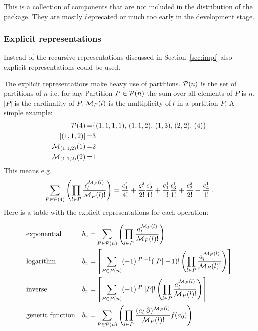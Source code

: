 \documentclass{article}
\begin{document}
This is a collection of components that are not included in the
distribution of the package. They are mostly deprecated or much too
early in the development stage.

\subsubsection{Explicit representations}

Instead of the recursive representations discussed in
Section~\ref{sec:impl} also explicit representations could be used.

The explicit representations make heavy use of partitions.
${\cal P}(n)$ is the set of partitions of $n$ i.e. for any
Partition $P \in {\cal P}(n)$ the sum over all elements of $P$ is
$n$. $|P|$ is the cardinality of $P$.
${\cal M}_P(l)$ is the multiplicity of $l$ in a partition $P$. A simple
example:
\begin{align*}
  {\cal P}(4)=&\{(1,1,1,1),\,(1,1,2),\,(1,3),\,(2,2),\,(4)\}\\
  |(1,1,2)|=&3\\
  {\cal M}_{(1,1,2)}(1)=&2\\
  {\cal M}_{(1,1,2)}(2)=&1\\
\end{align*}
This means e.g. 
\begin{equation}
  \label{eq:exp_ex}
\sum_{P \in {\cal P}(4)} \left(\prod_{l \in P} \frac{c^{{\cal M}_P(l)}_l}{{\cal M}_P(l)!} \right)=
  \frac{c_1^4}{4!}+\frac{c_1^2}{2!}\frac{c_2^1}{1!}+\frac{c_1^1}{1!}\frac{c_3^1}{1!}+\frac{c_2^2}{2!}+\frac{c_4^1}{1!}\,.
\end{equation}
Here is a table with the explicit representations for each operation:


\begin{align}
  &\text{exponential} & b_n=& \sum_{P \in {\cal P}(n)} \left(\prod_{l \in P}
    \frac{a^{{\cal M}_P(l)}_l}{{\cal M}_P(l)!} \right)
  \notag\\
  &\text{logarithm} & b_n=&\left[\sum_{P \in {\cal P}(n)}
    (-1)^{|P|-1}(|P|-1)!\left(\prod_{l \in P} \frac{a^{{\cal
            M}_P(l)}_l}{{\cal M}_P(l)!} \right)\right]
  \notag\\
  &\text{inverse} & b_n=&\left[\sum_{P \in {\cal P}(n)}
    (-1)^{|P|}|P|!\left(\prod_{l \in P} \frac{a^{{\cal M}_P(l)}_l}{{\cal
          M}_P(l)!} \right)\right]
  \notag\\
  &\text{generic function}& b_n=& \sum_{P \in {\cal P}(n)} \left(\prod_{l \in P}
    \frac{(a_l \;\partial)^{{\cal M}_P(l)}}{{\cal M}_P(l)!}
    f(a_0)\right)
\label{eq:expl}
\end{align}
\end{document}
